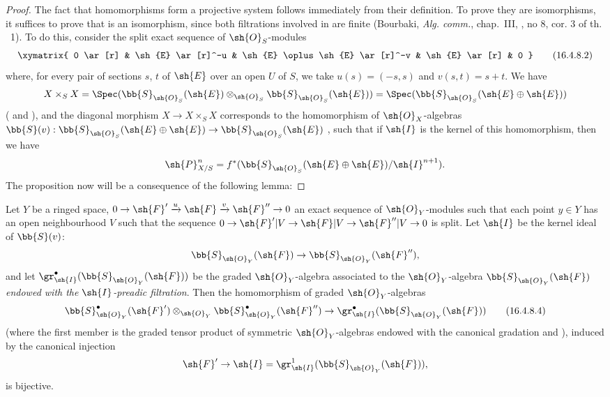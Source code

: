 \begin{proof}
The fact that homomorphisms  form a projective system follows immediately from their definition.
To prove they are isomorphisms, it suffices to 
prove that  is an isomorphism, since both filtrations involved in  are finite (Bourbaki, \emph{Alg. comm.}, chap.~III, , no 8, cor. 3 of th. ~1).
To do this, consider the split exact sequence of $\sh{O}_S$-modules
\[
  \label{IV.16.4.8.2}
  \xymatrix{
    0 \ar[r] & \sh{E} \ar[r]^-u & \sh{E} \oplus \sh{E} \ar[r]^-v & \sh{E} \ar[r] & 0
  }
  \tag{16.4.8.2}
\] 
where, for every pair of sections $s$, $t$ of $\sh{E}$ over an open $U$ of $S$, we take $u(s) = (-s, s)$ and $v(s,t) = s + t$.
We have
\[
  X \times_S X = \Spec(\bb{S}_{\sh{O}_S}(\sh{E}) \otimes_{\sh{O}_S} \bb{S}_{\sh{O}_S}(\sh{E})) = \Spec(\bb{S}_{\sh{O}_S}(\sh{E} \oplus \sh{E}))
\]
( and ), and the diagonal morphism $X \to X \times_S X$ corresponds  to the homomorphism of $\sh{O}_X$-algebras $\bb{S}(v): \bb{S}_{\sh{O}_S}(\sh{E} \oplus \sh{E}) \to \bb{S}_{\sh{O}_S}(\sh{E})$ , such that if $\sh{I}$ is the kernel of this homomorphism, then we have
\[
  \sh{P}_{X/S}^n = f^*(\bb{S}_{\sh{O}_S}(\sh{E} \oplus \sh{E})/\sh{I}^{n+1}).
\]
The proposition now will be a consequence of the following lemma:
\end{proof}

\begin{lemma}[16.4.8.3]
\label{IV.16.4.8.3}
Let $Y$ be a ringed space, $0 \to \sh{F}'  \xrightarrow{u} \sh{F} \xrightarrow{v} \sh{F}'' \to 0$ an exact sequence of $\sh{O}_Y$-modules such that each point $y \in Y$ has an open neighbourhood $V$ such that the sequence $0 \to \sh{F}'|V \to \sh{F}|V \to \sh{F}''|V \to 0$ is split.
Let $\sh{I}$ be the kernel ideal of $\bb{S}(v)$:
\[
  \bb{S}_{\sh{O}_Y}(\sh{F}) \to \bb{S}_{\sh{O}_Y}(\sh{F}''),
\]
and let $\gr_{\sh{I}}^\bullet(\bb{S}_{\sh{O}_Y}(\sh{F}))$ be the graded $\sh{O}_Y$-algebra associated to the $\sh{O}_Y$-algebra $\bb{S}_{\sh{O}_Y}(\sh{F})$ \emph{endowed with the $\sh{I}$-preadic filtration}.
Then the homomorphism of graded $\sh{O}_Y$-algebras
\[
  \label{IV.16.4.8.4}
  \bb{S}_{\sh{O}_Y}^\bullet(\sh{F}') \otimes_{\sh{O}_Y} \bb{S}_{\sh{O}_Y}^\bullet(\sh{F}'') \to \gr_{\sh{I}}^\bullet(\bb{S}_{\sh{O}_Y}(\sh{F}))
  \tag{16.4.8.4}
\]
(where the first member is the graded tensor product of symmetric $\sh{O}_Y$-algebras endowed with the canonical gradation  and ), induced by the canonical injection
\[
  \sh{F}' \to \sh{I} = \gr_{\sh{I}}^1(\bb{S}_{\sh{O}_Y}(\sh{F})),
\]
is bijective.
\end{lemma}

